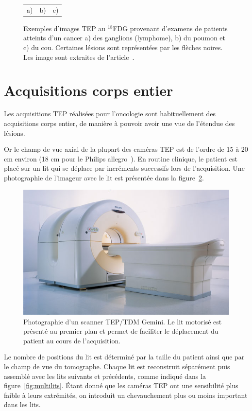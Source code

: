 \begin{figure}[h!]
\begin{tabular}{c c c}
a) & b) & c)
\end{tabular}
\caption[Exemples d'images TEP]{Exemples d’images TEP au $^{18}$FDG provenant d’examens de patients atteints d’un cancer a) des ganglions (lymphome), b) du poumon et c) du cou. Certaines lésions sont représentées par les flèches noires. Les image sont extraites de l'article~\cite{rohren2004clinical}.}
\label{fig:exTEP}
\end{figure}

\section{Acquisitions corps entier}


Les acquisitions TEP réalisées pour l'oncologie sont habituellement des acquisitions corps entier, de manière à pouvoir avoir une vue de l'étendue des lésions.

Or le champ de vue axial de la plupart des caméras TEP est de l'ordre de 15 à 20 cm environ (18 cm pour le Philips allegro~\cite{lamare2006validation}). En routine clinique, le patient est placé sur un lit qui se déplace par incréments successifs lors de l'acquisition. Une photographie de l'imageur avec le lit est présentée dans la figure~\ref{fig:photoGemini}.

\begin{figure}
\centering
\includegraphics[width=12cm]{images/gemini}
\caption[Photographie d'un scanner TEP Gemini]{Photographie d'un scanner TEP/TDM Gemini. Le lit motorisé est présenté au premier plan et permet de faciliter le déplacement du patient au cours de l'acquisition.}
\label{fig:photoGemini}
\end{figure}

Le nombre de positions du lit est déterminé par la taille du patient ainsi que par le champ de vue du tomographe. Chaque lit est reconstruit séparément puis assemblé avec les lits suivants et précédents, comme indiqué dans la figure~\ref{fig:multilits}. \'Etant donné que les caméras TEP ont une sensibilité plus faible à leurs extrémités, on introduit un chevauchement plus ou moins important dans les lits.

